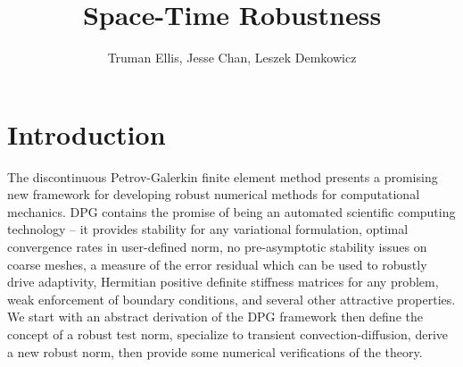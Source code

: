 \documentclass{article}
\title{Space-Time Robustness}
\author{Truman Ellis, Jesse Chan, Leszek Demkowicz}
\date{}
\begin{document}
\maketitle







\section{Introduction}
The discontinuous Petrov-Galerkin finite element method presents a promising new framework for developing robust numerical methods for computational mechanics.
DPG contains the promise of being an automated scientific computing technology -- it provides stability for any variational formulation, 
optimal convergence rates in user-defined norm, no pre-asymptotic stability issues on coarse meshes, 
a measure of the error residual which can be used to robustly drive adaptivity, 
Hermitian positive definite stiffness matrices for any problem, weak enforcement of boundary conditions, and several other attractive properties.
We start with an abstract derivation of the DPG framework then define the concept of a robust test norm, 
specialize to transient convection-diffusion, derive a new robust norm, then provide some numerical verifications of the theory.
\end{document}
